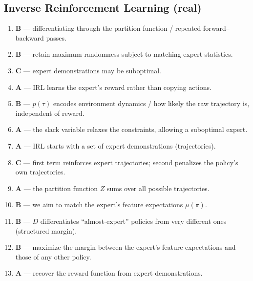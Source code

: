 \documentclass[11pt,oneside]{article}
\begin{document}
\subsection*{Inverse Reinforcement Learning (real)}
\begin{enumerate}[label=\textbf{Q\arabic*.}, leftmargin=3em, itemsep=3pt, start=21]
  \item \textbf{B} --- differentiating through the partition function / repeated forward--backward passes.
  \item \textbf{B} --- retain maximum randomness subject to matching expert statistics.
  \item \textbf{C} --- expert demonstrations may be suboptimal.
  \item \textbf{A} --- IRL learns the expert's reward rather than copying actions.
  \item \textbf{B} --- $p(\tau)$ encodes environment dynamics / how likely the raw trajectory is, independent of reward.
  \item \textbf{A} --- the slack variable relaxes the constraints, allowing a suboptimal expert.
  \item \textbf{A} --- IRL starts with a set of expert demonstrations (trajectories).
  \item \textbf{C} --- first term reinforces expert trajectories; second penalizes the policy's own trajectories.
  \item \textbf{A} --- the partition function $Z$ sums over all possible trajectories.
  \item \textbf{B} --- we aim to match the expert's feature expectations $\mu(\pi)$.
  \item \textbf{B} --- $D$ differentiates ``almost-expert'' policies from very different ones (structured margin).
  \item \textbf{B} --- maximize the margin between the expert's feature expectations and those of any other policy.
  \item \textbf{A} --- recover the reward function from expert demonstrations.
\end{enumerate}
\end{document}
